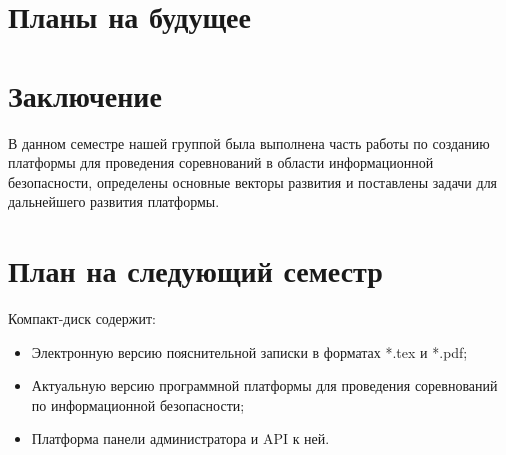 \newpage
\section{Планы на будущее}


\newpage
\section*{Заключение}
В данном семестре нашей группой была выполнена часть работы по созданию платформы для проведения соревнований в области информационной безопасности, определены основные векторы развития и поставлены задачи для дальнейшего развития платформы.
 
\newpage
\section{План на следующий семестр}


\newpage
\renewcommand{\refname}{Список использованных источников}


Компакт-диск содержит: 
\begin{itemize}
\item Электронную версию пояснительной записки в форматах *.tex и *.pdf;
\item Актуальную версию программной платформы для проведения соревнований по информационной безопасности;
\item Платформа панели администратора и API к ней.
\end{itemize}
 

